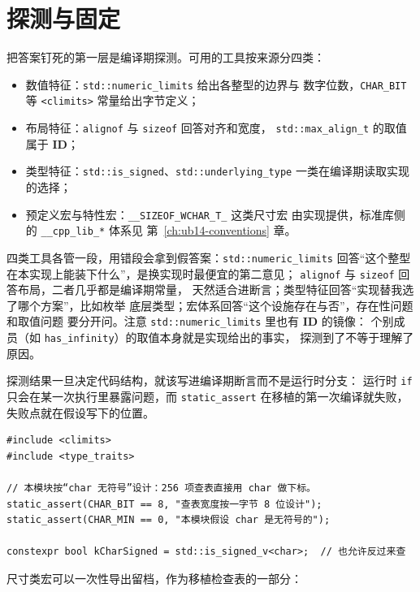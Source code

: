 \documentclass[12pt,a4paper,fontset=fandol]{ctexbook}
\newcommand{\Tp}[1]{\texttt{#1}}
\newcommand{\IDB}{\textbf{\textsf{ID}}}
\newcommand{\Hdr}[1]{\texttt{<#1>}}
\newcommand{\Feat}[1]{\texttt{#1}}
\begin{document}
\section{探测与固定}\label{sec:ub13-detect-pin}

把答案钉死的第一层是编译期探测。可用的工具按来源分四类：

\begin{itemize}
\item 数值特征：\Tp{std::numeric\_limits} 给出各整型的边界与
    数字位数，\Feat{CHAR\_BIT} 等 \Hdr{climits} 常量给出字节定义；
\item 布局特征：\Tp{alignof} 与 \Tp{sizeof} 回答对齐和宽度，
    \Tp{std::max\_align\_t} 的取值属于 \IDB{}；
\item 类型特征：\Tp{std::is\_signed}、\Tp{std::underlying\_type}
    一类在编译期读取实现的选择；
\item 预定义宏与特性宏：\Feat{\_\_SIZEOF\_WCHAR\_T\_} 这类尺寸宏
    由实现提供，标准库侧的 \Feat{\_\_cpp\_lib\_*} 体系见
    第~\ref{ch:ub14-conventions} 章。
\end{itemize}

四类工具各管一段，用错段会拿到假答案：\Tp{std::numeric\_limits}
回答“这个整型在本实现上能装下什么”，是换实现时最便宜的第二意见；
\Tp{alignof} 与 \Tp{sizeof} 回答布局，二者几乎都是编译期常量，
天然适合进断言；类型特征回答“实现替我选了哪个方案”，比如枚举
底层类型；宏体系回答“这个设施存在与否”，存在性问题和取值问题
要分开问。注意 \Tp{std::numeric\_limits} 里也有 \IDB{} 的镜像：
个别成员（如 \Tp{has\_infinity}）的取值本身就是实现给出的事实，
探测到了不等于理解了原因。

探测结果一旦决定代码结构，就该写进编译期断言而不是运行时分支：
运行时 \Tp{if} 只会在某一次执行里暴露问题，而 \Tp{static\_assert}
在移植的第一次编译就失败，失败点就在假设写下的位置。

\begin{lstlisting}[style=cppstyle, caption={把实现定义的选择写进编译期断言：换实现先断言，而不是上线后翻车}]
#include <climits>
#include <type_traits>

// 本模块按“char 无符号”设计：256 项查表直接用 char 做下标。
static_assert(CHAR_BIT == 8, "查表宽度按一字节 8 位设计");
static_assert(CHAR_MIN == 0, "本模块假设 char 是无符号的");

constexpr bool kCharSigned = std::is_signed_v<char>;  // 也允许反过来查
\end{lstlisting}

尺寸类宏可以一次性导出留档，作为移植检查表的一部分：
\end{document}
